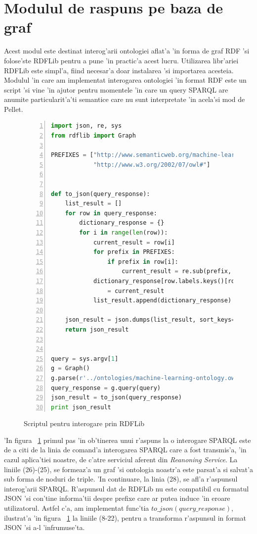 \documentclass[12pt,a4paper,twoside]{report}
\begin{document}
\section{Modulul de raspuns pe baza de graf}

Acest modul este destinat interog'arii ontologiei aflat'a 'in forma de graf RDF 'si folose'ste RDFLib pentru a pune 'in practic'a acest lucru. Utilizarea libr'ariei RDFLib este simpl'a, fiind necesar'a doar instalarea 'si importarea acesteia. Modulul 'in care am implementat interogarea ontologiei 'in format RDF este un script 'si vine 'in ajutor pentru momentele 'in care un query SPARQL are anumite particularit'a'ti semantice care nu sunt interpretate 'in acela'si mod de Pellet. 

\begin{figure}
\centering
\begin{lstlisting}[language=Python, basicstyle=\footnotesize,numbers=left, xleftmargin=.05\textwidth]
import json, re, sys
from rdflib import Graph

PREFIXES = ["http://www.semanticweb.org/machine-learning-ontology#",  
            "http://www.w3.org/2002/07/owl#"]


def to_json(query_response):
    list_result = []
    for row in query_response:
        dictionary_response = {}
        for i in range(len(row)):
            current_result = row[i]
            for prefix in PREFIXES:
                if prefix in row[i]:
                    current_result = re.sub(prefix, "", row[i])
            dictionary_response[row.labels.keys()[row.labels.values().index(i)]] \
                = current_result
            list_result.append(dictionary_response)

    json_result = json.dumps(list_result, sort_keys=False, indent=4)
    return json_result


query = sys.argv[1]
g = Graph()
g.parse(r'../ontologies/machine-learning-ontology.owl', format="xml")
query_response = g.query(query)
json_result = to_json(query_response)
print json_result

\end{lstlisting}
        \caption{Scriptul pentru interogare prin RDFLib}
      \label{fig:rdflib_script}
\end{figure}

'In figura ~\ref{fig:rdflib_script} primul pas 'in ob'tinerea unui r'aspuns la o interogare SPARQL este de a citi de la linia de comand'a interogarea SPARQL care a fost transmis'a, 'in cazul aplica'tiei noastre, de c'atre serviciul aferent din {\it Reanoning Service}. La liniile (26)-(25), se formeaz'a un graf 'si ontologia noastr'a este parsat'a si salvat'a sub forma de noduri de triple. 'In continuare, la linia (28), se afl'a r'aspunsul interog'arii SPARQL. R'aspunsul dat de RDFLib nu este compatibil cu formatul JSON 'si con'tine informa'tii despre prefixe care ar putea induce 'in eroare utilizatorul. Astfel c'a, am implementat func'tia $to\_json(query\_response)$, ilustrat'a 'in figura ~\ref{fig:rdflib_script} la liniile (8-22), pentru a transforma r'aspunsul in format JSON 'si a-l 'infrumuse'ta. 
\end{document}
